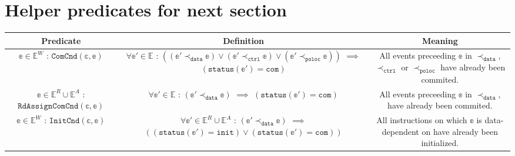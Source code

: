 \documentclass{article}
\begin{document}
\section{Helper predicates for next section}
\begin{center}
 \begin{tabular}{||c | c | c ||} 
 \hline
 \textbf{Predicate} & \textbf{Definition} & \textbf{Meaning} \\ [0.5ex] 
 \hline\hline
 \makecell{$\mathbb{e} \in \mathbb{E}^W$ :\\ $\texttt{ComCnd}(\mathbb{c},\mathbb{e})$} & \makecell{$\forall \mathbb{e'} \in \mathbb{E}$ :\\$((\mathbb{e}' \prec_\texttt{data} \mathbb{e}) \vee (\mathbb{e'} \prec_\texttt{ctrl} \mathbb{e}) \vee (\mathbb{e'} \prec_\texttt{poloc} \mathbb{e}))$ \\ $\implies$ \\ $(\texttt{status}(\mathbb{e'}) = \texttt{com})$} & \makecell{All events preceeding $\mathbb{e}$ in $\prec_\texttt{data}$, $\prec_\texttt{ctrl}$\\ or $\prec_\texttt{poloc}$ have already been commited.}  \\
 \hline
 \makecell{$\mathbb{e} \in \mathbb{E}^R \cup \mathbb{E}^A$ :\\ $\texttt{RdAssignComCnd}(\mathbb{c},\mathbb{e})$} & \makecell{$\forall \mathbb{e'} \in \mathbb{E}$ :\\$(\mathbb{e}' \prec_\texttt{data} \mathbb{e}) $ \\ $\implies$ \\ $(\texttt{status}(\mathbb{e'}) = \texttt{com})$} & \makecell{All events preceeding $\mathbb{e}$ in $\prec_\texttt{data}$,\\ have already been commited.}  \\
 \hline
 \makecell{$\mathbb{e} \in \mathbb{E}^W$ : \\ $\texttt{InitCnd}(\mathbb{c},\mathbb{e})$} & \makecell{$\forall \mathbb{e}' \in \mathbb{E}^R \cup \mathbb{E}^A$ :\\$(\mathbb{e}' \prec_\texttt{data} \mathbb{e})$ \\ $\implies$ \\ $((\texttt{status}(\mathbb{e'}) = \texttt{init}) \vee (\texttt{status}(\mathbb{e}') = \texttt{com}))$ } & \makecell{All instructions on which $\mathbb{e}$ is data-dependent\\ on have already been initialized. } \\
 \hline

\end{tabular}
\end{center}
\end{document}
